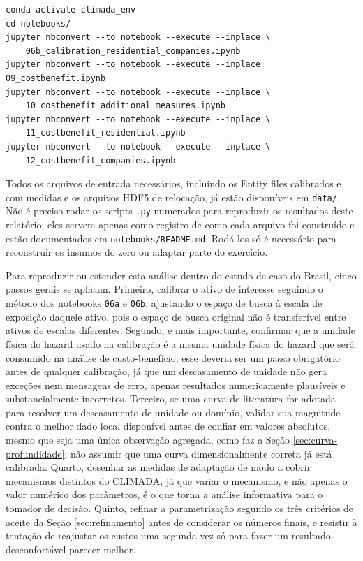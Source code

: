\documentclass[11pt]{article}
\begin{document}
\begin{verbatim}
conda activate climada_env
cd notebooks/
jupyter nbconvert --to notebook --execute --inplace \
    06b_calibration_residential_companies.ipynb
jupyter nbconvert --to notebook --execute --inplace 09_costbenefit.ipynb
jupyter nbconvert --to notebook --execute --inplace \
    10_costbenefit_additional_measures.ipynb
jupyter nbconvert --to notebook --execute --inplace \
    11_costbenefit_residential.ipynb
jupyter nbconvert --to notebook --execute --inplace \
    12_costbenefit_companies.ipynb
\end{verbatim}

Todos os arquivos de entrada necessários, incluindo os Entity files calibrados e com
medidas e os arquivos HDF5 de relocação, já estão disponíveis em \texttt{data/}. Não é
preciso rodar os scripts \texttt{.py} numerados para reproduzir os resultados deste
relatório; eles servem apenas como registro de como cada arquivo foi construído e estão
documentados em \texttt{notebooks/README.md}. Rodá-los só é necessário para reconstruir os
insumos do zero ou adaptar parte do exercício.

Para reproduzir ou estender esta análise dentro do estudo de caso do Brasil, cinco passos
gerais se aplicam. Primeiro, calibrar o ativo de interesse seguindo o método dos notebooks
\texttt{06a} e \texttt{06b}, ajustando o espaço de busca à escala de exposição daquele
ativo, pois o espaço de busca original não é transferível entre ativos de escalas
diferentes. Segundo, e mais importante, confirmar que a unidade física do hazard usado na
calibração é a mesma unidade física do hazard que será consumido na análise de
custo-benefício; esse deveria ser um passo obrigatório antes de qualquer calibração, já que
um descasamento de unidade não gera exceções nem mensagens de erro, apenas resultados
numericamente plausíveis e substancialmente incorretos. Terceiro, se uma curva de
literatura for adotada para resolver um descasamento de unidade ou domínio, validar sua
magnitude contra o melhor dado local disponível antes de confiar em valores absolutos,
mesmo que seja uma única observação agregada, como faz a Seção
\ref{sec:curva-profundidade}; não assumir que uma curva dimensionalmente correta já está
calibrada. Quarto, desenhar as medidas de adaptação de
modo a cobrir mecanismos distintos do CLIMADA, já que variar o mecanismo, e não apenas o
valor numérico dos parâmetros, é o que torna a análise informativa para o tomador de
decisão. Quinto, refinar a parametrização segundo os três critérios de aceite da Seção
\ref{sec:refinamento} antes de considerar os números finais, e resistir à tentação de
reajustar os custos uma segunda vez só para fazer um resultado desconfortável parecer
melhor.
\end{document}

